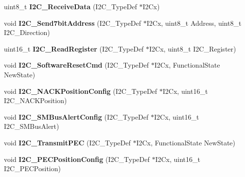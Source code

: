 \begin{DoxyCompactItemize}
\item 
\hypertarget{group__I2C__Exported__Functions_gaeaaa4b6f77f50eb57465148c55d27fb2}{
uint8\_\-t {\bfseries I2C\_\-ReceiveData} (I2C\_\-TypeDef $\ast$I2Cx)}
\label{group__I2C__Exported__Functions_gaeaaa4b6f77f50eb57465148c55d27fb2}

\item 
\hypertarget{group__I2C__Exported__Functions_ga009fc2a5b2313c36da39ece39a1156a6}{
void {\bfseries I2C\_\-Send7bitAddress} (I2C\_\-TypeDef $\ast$I2Cx, uint8\_\-t Address, uint8\_\-t I2C\_\-Direction)}
\label{group__I2C__Exported__Functions_ga009fc2a5b2313c36da39ece39a1156a6}

\item 
\hypertarget{group__I2C__Exported__Functions_ga8021dc796d15f997356b0583d6346805}{
uint16\_\-t {\bfseries I2C\_\-ReadRegister} (I2C\_\-TypeDef $\ast$I2Cx, uint8\_\-t I2C\_\-Register)}
\label{group__I2C__Exported__Functions_ga8021dc796d15f997356b0583d6346805}

\item 
\hypertarget{group__I2C__Exported__Functions_ga1289c908aeb882443aba323b459c638b}{
void {\bfseries I2C\_\-SoftwareResetCmd} (I2C\_\-TypeDef $\ast$I2Cx, FunctionalState NewState)}
\label{group__I2C__Exported__Functions_ga1289c908aeb882443aba323b459c638b}

\item 
\hypertarget{group__I2C__Exported__Functions_gad08ebffc3a234d84e6405ec115bd74f1}{
void {\bfseries I2C\_\-NACKPositionConfig} (I2C\_\-TypeDef $\ast$I2Cx, uint16\_\-t I2C\_\-NACKPosition)}
\label{group__I2C__Exported__Functions_gad08ebffc3a234d84e6405ec115bd74f1}

\item 
\hypertarget{group__I2C__Exported__Functions_ga75a810776d9710d2f6d9c5d9e93241c6}{
void {\bfseries I2C\_\-SMBusAlertConfig} (I2C\_\-TypeDef $\ast$I2Cx, uint16\_\-t I2C\_\-SMBusAlert)}
\label{group__I2C__Exported__Functions_ga75a810776d9710d2f6d9c5d9e93241c6}

\item 
\hypertarget{group__I2C__Exported__Functions_gaa27d1440290fe601e730b6980999afe3}{
void {\bfseries I2C\_\-TransmitPEC} (I2C\_\-TypeDef $\ast$I2Cx, FunctionalState NewState)}
\label{group__I2C__Exported__Functions_gaa27d1440290fe601e730b6980999afe3}

\item 
\hypertarget{group__I2C__Exported__Functions_ga5d0f939bdd45542502827bf408f24161}{
void {\bfseries I2C\_\-PECPositionConfig} (I2C\_\-TypeDef $\ast$I2Cx, uint16\_\-t I2C\_\-PECPosition)}
\label{group__I2C__Exported__Functions_ga5d0f939bdd45542502827bf408f24161}


\end{DoxyCompactItemize}
